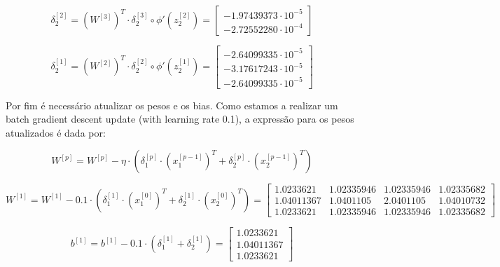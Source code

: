 \documentclass[a4paper,12pt]{article} %
\begin{document}
\begin{enumerate}
\begin{equation*}
    \delta^{[2]}_2 = (W^{[3]})^T \cdot \delta^{[3]}_2 \circ \phi'(z^{[2]}_2) = \begin{bmatrix} -1.97439373\cdot 10^{-5} \\ -2.72552280\cdot 10^{-4} \end{bmatrix}
\end{equation*}

\begin{equation*}
    \delta^{[1]}_2 = (W^{[2]})^T \cdot \delta^{[2]}_2 \circ \phi'(z^{[1]}_2) = \begin{bmatrix} -2.64099335\cdot 10^{-5} \\ -3.17617243\cdot 10^{-5} \\ -2.64099335\cdot 10^{-5} \end{bmatrix}
\end{equation*}

Por fim é necessário atualizar os pesos e os bias. Como estamos a realizar um batch gradient descent update (with learning rate 0.1), a expressão para os pesos atualizados é dada por:

\begin{equation*}
    W^{[p]} = W^{[p]} - \eta \cdot (\delta^{[p]}_1 \cdot (x^{[p-1]}_1)^T + \delta^{[p]}_2 \cdot (x^{[p-1]}_2)^T)
\end{equation*}

\begin{equation*}
    W^{[1]} = W^{[1]} - 0.1 \cdot (\delta^{[1]}_1 \cdot (x^{[0]}_1)^T + \delta^{[1]}_2 \cdot (x^{[0]}_2)^T) = \begin{bmatrix} 1.0233621 & 1.02335946 & 1.02335946 & 1.02335682 \\
                                                                                                                            1.04011367 & 1.0401105 & 2.0401105 & 1.04010732 \\
                                                                                                                            1.0233621 & 1.02335946 & 1.02335946 & 1.02335682 \end{bmatrix}
\end{equation*}

\begin{equation*}
    b^{[1]} = b^{[1]} - 0.1 \cdot (\delta^{[1]}_1 + \delta^{[1]}_2) = \begin{bmatrix} 1.0233621 \\ 1.04011367 \\ 1.0233621 \end{bmatrix}
\end{equation*}


\end{enumerate}
\end{document}
